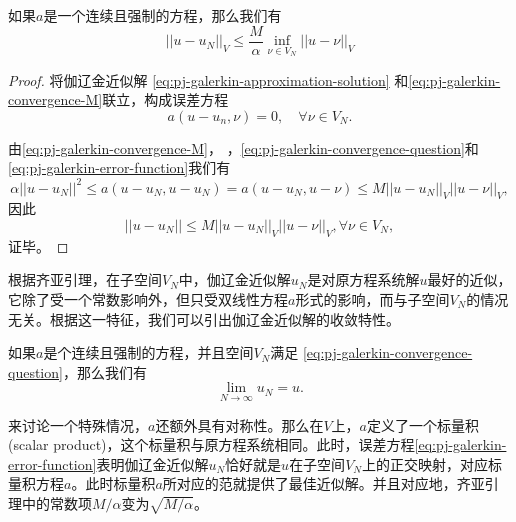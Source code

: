 \begin{subappendices}
\begin{lemma}[齐亚引理]
  \label{lemma:pj-galerkin-cea-lemma}
  如果$a$是一个连续且强制的方程，那么我们有
  \begin{equation}
    \label{eq:pj-galerkin-cea-lemma}
    ||u - u_N || _{V} \le \frac{M}{\alpha} \inf_{\nu \in V_N} || u - \nu || _{V}
  \end{equation}
\end{lemma}
\begin{proof}
  将伽辽金近似解 \eqref{eq:pj-galerkin-approximation-solution}
  和\eqref{eq:pj-galerkin-convergence-M}联立，构成误差方程
  \begin{equation}
    \label{eq:pj-galerkin-error-function}
    a(u-u_n,\nu)=0, \quad \forall \nu \in V_N.
  \end{equation}

由\eqref{eq:pj-galerkin-convergence-M}， ，\eqref{eq:pj-galerkin-convergence-question}和 \eqref{eq:pj-galerkin-error-function}我们有
  \begin{equation*}
    \alpha ||u-u_N||^2 \le a(u-u_N, u-u_N) = a(u - u_N,u-\nu) \le M ||u-u_N||_{V} ||u-\nu||_{V},
  \end{equation*}
  因此
  \begin{equation*}
    ||u-u_N|| \le M ||u-u_N||_{V} ||u-\nu||_{V}, \forall \nu \in V_N,
  \end{equation*}
  证毕。
\end{proof}

根据齐亚引理，在子空间$V_N$中，伽辽金近似解$u_N$是对原方程系统解$u$最好的近似，它除了受一个常数影响外，但只受双线性方程$a$形式的影响，而与子空间$V_N$的情况无关。根据这一特征，我们可以引出伽辽金近似解的收敛特性。

\begin{theorem}
  \label{theorem:pj-galerkin-approximation-convergence}
  如果$a$是个连续且强制的方程，并且空间$V_N$满足  \eqref{eq:pj-galerkin-convergence-question}，那么我们有
  \begin{equation*}
    \lim_{N \rightarrow \infty} u_N = u.
  \end{equation*}
\end{theorem}

来讨论一个特殊情况，$a$还额外具有对称性。那么在$V$上，$a$定义了一个标量积(scalar product)，这个标量积与原方程系统相同。此时，误差方程\eqref{eq:pj-galerkin-error-function}表明伽辽金近似解$u_N$恰好就是$u$在子空间$V_N$上的正交映射，对应标量积方程$a$。此时标量积$a$所对应的范就提供了最佳近似解。并且对应地，齐亚引理中的常数项$M/\alpha$变为$\sqrt{M/\alpha}$。


\end{subappendices}
